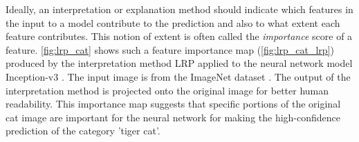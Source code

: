 Ideally, an interpretation or explanation method should indicate which features in the input to a model contribute to the prediction and also to what extent each feature contributes. This notion of extent is often called the \textit{importance} score of a feature. \autoref{fig:lrp_cat} shows such a feature importance map (\autoref{fig:lrp_cat_lrp}) produced by the interpretation method LRP \cite{bach2015pixel} applied to the neural network model Inception-v3 \cite{szegedy2016rethinking}. The input image is from the ImageNet dataset \cite{ILSVRC15}. The output of the interpretation method is projected onto the original image for better human readability. This importance map suggests that specific portions of the original cat image are important for the neural network for making the high-confidence prediction of the category 'tiger cat'. 

